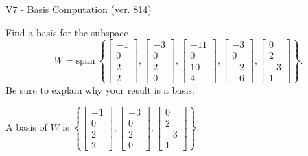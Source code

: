 \begin{exercise}
  \begin{exerciseTitle}V7 - Basis Computation (ver. 814)\end{exerciseTitle}
  \begin{exerciseStatement}
    Find a basis for the subspace 
\[W=\mathrm{span}\ \left\{\left[\begin{array}{r}
-1 \\
0 \\
2 \\
2
\end{array}\right] , \left[\begin{array}{r}
-3 \\
0 \\
2 \\
0
\end{array}\right] , \left[\begin{array}{r}
-11 \\
0 \\
10 \\
4
\end{array}\right] , \left[\begin{array}{r}
-3 \\
0 \\
-2 \\
-6
\end{array}\right] , \left[\begin{array}{r}
0 \\
2 \\
-3 \\
1
\end{array}\right]\right\}.\]
 Be sure to explain why your result is a basis.


  \end{exerciseStatement}
  \begin{exerciseAnswer}
   A basis of \(W\) is  \(\left\{\left[\begin{array}{r}
-1 \\
0 \\
2 \\
2
\end{array}\right] , \left[\begin{array}{r}
-3 \\
0 \\
2 \\
0
\end{array}\right] , \left[\begin{array}{r}
0 \\
2 \\
-3 \\
1
\end{array}\right]\right\}\).
  


  \end{exerciseAnswer}
\end{exercise}